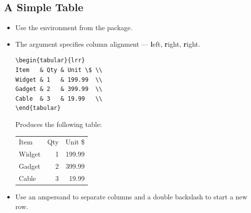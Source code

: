 \documentclass[usenames,dvipsnames]{beamer}
\begin{document}
\subsection{A Simple Table}
\begin{frame}[fragile]{\insertsubsection}
\begin{itemize}\item Use the  environment from the  package.
\item The argument specifies column alignment --- \textbf{l}eft, \textbf{r}ight, \textbf{r}ight.
\smallskip

\begin{exampletwouptinynoframe}
{\color{OliveGreen}\begin{Verbatim}[fontsize=\scriptsize]
\begin{tabular}{lrr}
Item   & Qty & Unit \$ \\
Widget & 1   & 199.99  \\
Gadget & 2   & 399.99  \\
Cable  & 3   & 19.99   \\
\end{tabular}
\end{Verbatim}}
\end{exampletwouptinynoframe}

\smallskip

Produces the following table:

\begin{exampletwouptinynoframe}
{\color{Blue}\begin{tabular}{lrr}
Item   & Qty & Unit \$ \\
Widget & 1   & 199.99  \\
Gadget & 2   & 399.99  \\
Cable  & 3   & 19.99   \\
\end{tabular}}
\end{exampletwouptinynoframe}
\item Use an ampersand \keystrokebftt{\&} to separate columns and a double backslash \keystrokebftt{\bs}\keystrokebftt{\bs} to start a new row.
\end{itemize}
\end{frame}
\end{document}
